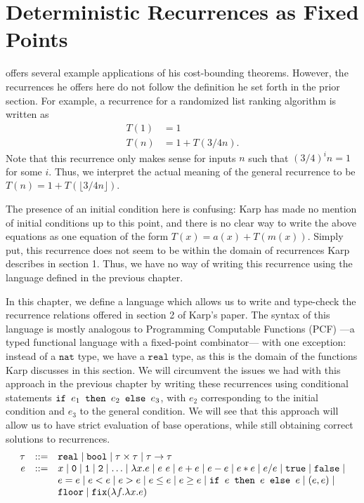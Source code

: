 \chapter{Deterministic Recurrences as Fixed Points}
\cite[\S2]{Karp} offers several example applications of his cost-bounding theorems. However, the recurrences
he offers here do not follow the definition he set forth in the prior section. For example, a recurrence for a randomized list 
ranking algorithm is written as
\begin{align*}
T(1) &= 1 \\
T(n) &= 1 + T(3/4n).
\end{align*}
Note that this recurrence only makes sense for inputs $n$ such that
$(3/4)^in = 1$ for some $i$. Thus, we interpret the actual meaning of the general recurrence to be
$T(n) = 1 + T(\lfloor 3/4n \rfloor)$. 

The presence of an initial condition here is confusing: Karp has made no mention of initial conditions up to this point, and 
there is no clear way to write the above equations as one equation of the form $T(x) = a(x) + T(m(x))$. Simply put, 
this recurrence does not seem to be within the domain of recurrences Karp describes in section 1. Thus, we have no way
of writing this recurrence using the language defined in the previous chapter. 

In this chapter, we define a language which allows us to write and type-check the recurrence relations offered in section 2 of Karp's paper. The syntax of this language is mostly analogous to Programming Computable Functions (PCF) ---a typed functional language with a fixed-point combinator--- with  one exception: instead of a 
$\texttt{nat}$ type, we have a $\texttt{real}$ type, as this is the domain of the functions Karp discusses in this section. 
We will circumvent the issues we had with this approach in the previous chapter by writing these recurrences
using conditional statements $\texttt{if } e_1 \texttt{ then } e_2 \texttt{ else } e_3$, with $e_2$ corresponding to the initial condition and $e_3$
to the general condition. We will see that this approach will allow us to have strict evaluation of base operations, while
still obtaining correct solutions to recurrences. 
\[
\begin{array}{rcl}
\tau &::=& \texttt{real} \mid \texttt{bool} \mid \tau \times \tau \mid \tau \rightarrow \tau \\
e &::=& x  \mid \texttt{0} \mid \texttt{1} \mid \texttt{2} \mid \dotsc \mid \lambda x.e \mid e \ e \mid e + e \mid e - e \mid  e  *  e 
\mid e / e \mid \texttt{true} \mid \texttt{false} \mid \\
  && e  =  e \mid e < e \mid e > e \mid e \leq e \mid e \geq e \mid 
     \texttt{if } e \texttt{ then } e \texttt{ else } e \mid (e, e) \mid \\
     && \texttt{floor} \mid \texttt{fix} (\lambda f.\lambda x.e) 
\end{array}
\]

